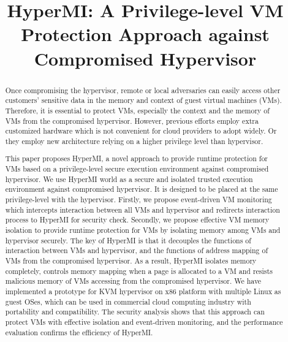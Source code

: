 \documentclass[conference]{IEEEtran}
\begin{document}
\title{HyperMI: A Privilege-level VM Protection Approach against Compromised Hypervisor}

\maketitle



\begin{abstract}

Once compromising the hypervisor, remote or local adversaries can easily access other customers' sensitive data in the memory and context of guest virtual machines (VMs).
Therefore, it is essential to protect VMs, especially the context and the memory of VMs from the compromised hypervisor.
However, previous efforts employ extra customized hardware which is not convenient for cloud providers to adopt widely. Or they employ new architecture relying on a higher privilege level than hypervisor. 

This paper proposes HyperMI, a novel approach to provide runtime protection for VMs based on a privilege-level secure execution environment against compromised hypervisor. 
We use HyperMI world as a secure and isolated trusted execution environment against compromised hypervisor. 
It is designed to be placed at the same privilege-level with the hypervisor.
Firstly, we propose event-driven VM monitoring which intercepts interaction between all VMs and hypervisor and redirects interaction process to HyperMI for security check. Secondly, we propose effective VM memory isolation to provide runtime protection for VMs by isolating memory among VMs and hypervisor securely. 
The key of HyperMI is that it decouples the functions of interaction between VMs and hypervisor, and the functions of address mapping of VMs from the compromised hypervisor. As a result, HyperMI isolates memory completely, controls memory mapping when a page is allocated to a VM and resists malicious memory of VMs accessing from the compromised hypervisor.
We have implemented a prototype for KVM hypervisor on x86 platform with multiple Linux as guest OSes, which can be used in commercial cloud computing industry with portability and compatibility. The security analysis shows that this approach can protect VMs with effective isolation and event-driven monitoring, and the performance evaluation confirms the efficiency of HyperMI.




\end{abstract}
\end{document}
